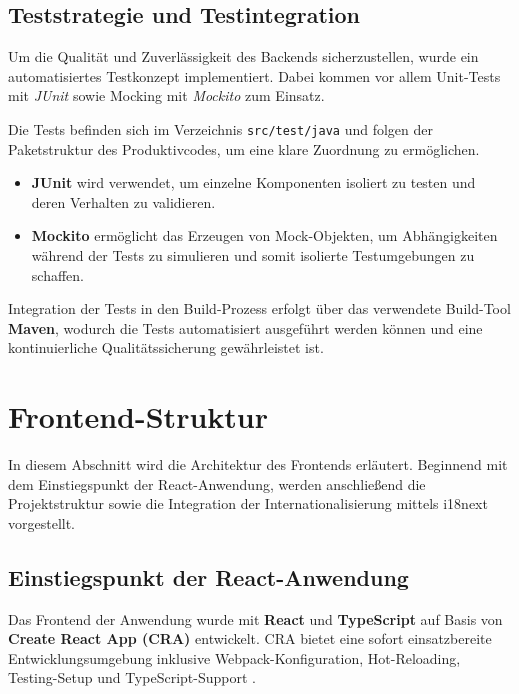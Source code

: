 \subsection{Teststrategie und Testintegration}

Um die Qualität und Zuverlässigkeit des Backends sicherzustellen, wurde ein automatisiertes Testkonzept implementiert. Dabei kommen vor allem Unit-Tests mit \textit{JUnit} sowie Mocking mit \textit{Mockito} zum Einsatz.

\noindent Die Tests befinden sich im Verzeichnis \texttt{src/test/java} und folgen der Paketstruktur des Produktivcodes, um eine klare Zuordnung zu ermöglichen.

\begin{itemize}
	\item \textbf{JUnit} wird verwendet, um einzelne Komponenten isoliert zu testen und deren Verhalten zu validieren.
	\item \textbf{Mockito} ermöglicht das Erzeugen von Mock-Objekten, um Abhängigkeiten während der Tests zu simulieren und somit isolierte Testumgebungen zu schaffen.
\end{itemize}

\noindent Integration der Tests in den Build-Prozess erfolgt über das verwendete Build-Tool \textbf{Maven}, wodurch die Tests automatisiert ausgeführt werden können und eine kontinuierliche Qualitätssicherung gewährleistet ist.


\section{Frontend-Struktur}

In diesem Abschnitt wird die Architektur des Frontends erläutert. Beginnend mit dem Einstiegspunkt der React-Anwendung, werden anschließend die Projektstruktur sowie die Integration der Internationalisierung mittels i18next vorgestellt.

\subsection{Einstiegspunkt der React-Anwendung}

Das Frontend der Anwendung wurde mit \textbf{React} und \textbf{TypeScript} auf Basis von \textbf{Create React App (CRA)} entwickelt. CRA bietet eine sofort einsatzbereite Entwicklungsumgebung inklusive Webpack-Konfiguration, Hot-Reloading, Testing-Setup und TypeScript-Support \cite{CRA2025}.

